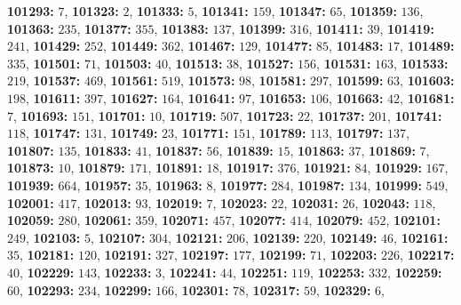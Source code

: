 \textsf{\bfseries 101293:} $7$, \textsf{\bfseries 101323:} $2$, \textsf{\bfseries 101333:} $5$, \textsf{\bfseries 101341:} $159$, \textsf{\bfseries 101347:} $65$, \textsf{\bfseries 101359:} $136$, \textsf{\bfseries 101363:} $235$, \textsf{\bfseries 101377:} $355$, \textsf{\bfseries 101383:} $137$, \textsf{\bfseries 101399:} $316$, \textsf{\bfseries 101411:} $39$, \textsf{\bfseries 101419:} $241$, \textsf{\bfseries 101429:} $252$, \textsf{\bfseries 101449:} $362$, \textsf{\bfseries 101467:} $129$, \textsf{\bfseries 101477:} $85$, \textsf{\bfseries 101483:} $17$, \textsf{\bfseries 101489:} $335$, \textsf{\bfseries 101501:} $71$, \textsf{\bfseries 101503:} $40$, \textsf{\bfseries 101513:} $38$, \textsf{\bfseries 101527:} $156$, \textsf{\bfseries 101531:} $163$, \textsf{\bfseries 101533:} $219$, \textsf{\bfseries 101537:} $469$, \textsf{\bfseries 101561:} $519$, \textsf{\bfseries 101573:} $98$, \textsf{\bfseries 101581:} $297$, \textsf{\bfseries 101599:} $63$, \textsf{\bfseries 101603:} $198$, \textsf{\bfseries 101611:} $397$, \textsf{\bfseries 101627:} $164$, \textsf{\bfseries 101641:} $97$, \textsf{\bfseries 101653:} $106$, \textsf{\bfseries 101663:} $42$, \textsf{\bfseries 101681:} $7$, \textsf{\bfseries 101693:} $151$, \textsf{\bfseries 101701:} $10$, \textsf{\bfseries 101719:} $507$, \textsf{\bfseries 101723:} $22$, \textsf{\bfseries 101737:} $201$, \textsf{\bfseries 101741:} $118$, \textsf{\bfseries 101747:} $131$, \textsf{\bfseries 101749:} $23$, \textsf{\bfseries 101771:} $151$, \textsf{\bfseries 101789:} $113$, \textsf{\bfseries 101797:} $137$, \textsf{\bfseries 101807:} $135$, \textsf{\bfseries 101833:} $41$, \textsf{\bfseries 101837:} $56$, \textsf{\bfseries 101839:} $15$, \textsf{\bfseries 101863:} $37$, \textsf{\bfseries 101869:} $7$, \textsf{\bfseries 101873:} $10$, \textsf{\bfseries 101879:} $171$, \textsf{\bfseries 101891:} $18$, \textsf{\bfseries 101917:} $376$, \textsf{\bfseries 101921:} $84$, \textsf{\bfseries 101929:} $167$, \textsf{\bfseries 101939:} $664$, \textsf{\bfseries 101957:} $35$, \textsf{\bfseries 101963:} $8$, \textsf{\bfseries 101977:} $284$, \textsf{\bfseries 101987:} $134$, \textsf{\bfseries 101999:} $549$, \textsf{\bfseries 102001:} $417$, \textsf{\bfseries 102013:} $93$, \textsf{\bfseries 102019:} $7$, \textsf{\bfseries 102023:} $22$, \textsf{\bfseries 102031:} $26$, \textsf{\bfseries 102043:} $118$, \textsf{\bfseries 102059:} $280$, \textsf{\bfseries 102061:} $359$, \textsf{\bfseries 102071:} $457$, \textsf{\bfseries 102077:} $414$, \textsf{\bfseries 102079:} $452$, \textsf{\bfseries 102101:} $249$, \textsf{\bfseries 102103:} $5$, \textsf{\bfseries 102107:} $304$, \textsf{\bfseries 102121:} $206$, \textsf{\bfseries 102139:} $220$, \textsf{\bfseries 102149:} $46$, \textsf{\bfseries 102161:} $35$, \textsf{\bfseries 102181:} $120$, \textsf{\bfseries 102191:} $327$, \textsf{\bfseries 102197:} $177$, \textsf{\bfseries 102199:} $71$, \textsf{\bfseries 102203:} $226$, \textsf{\bfseries 102217:} $40$, \textsf{\bfseries 102229:} $143$, \textsf{\bfseries 102233:} $3$, \textsf{\bfseries 102241:} $44$, \textsf{\bfseries 102251:} $119$, \textsf{\bfseries 102253:} $332$, \textsf{\bfseries 102259:} $60$, \textsf{\bfseries 102293:} $234$, \textsf{\bfseries 102299:} $166$, \textsf{\bfseries 102301:} $78$, \textsf{\bfseries 102317:} $59$, \textsf{\bfseries 102329:} $6$, 
